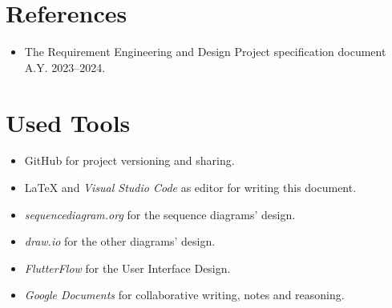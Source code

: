 \section{References}
\label{sec:references}%

\begin{itemize}
    \item The Requirement Engineering and Design Project specification document A.Y. 2023–2024. 
\end{itemize}

\section{Used Tools}
\label{sec:used_tools}%
\begin{itemize}
    \item GitHub for project versioning and sharing.
    \item \LaTeX{} and \textit{Visual Studio Code} as editor for writing this document.
    \item \textit{sequencediagram.org} for the sequence diagrams' design.
    \item \textit{draw.io} for the other diagrams' design.
    \item \textit{FlutterFlow} for the User Interface Design.
    \item \textit{Google Documents} for collaborative writing, notes and reasoning.
\end{itemize}
